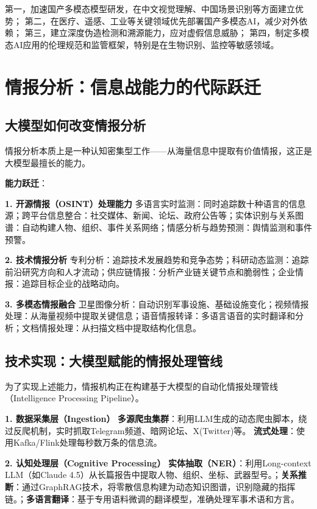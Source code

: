 第一，加速国产多模态模型研发，在中文视觉理解、中国场景识别等方面建立优势；
第二，在医疗、遥感、工业等关键领域优先部署国产多模态AI，减少对外依赖；
第三，建立深度伪造检测和溯源能力，应对虚假信息威胁；
第四，制定多模态AI应用的伦理规范和监管框架，特别是在生物识别、监控等敏感领域。

\section{情报分析：信息战能力的代际跃迁}

\subsection{大模型如何改变情报分析}

情报分析本质上是一种认知密集型工作——从海量信息中提取有价值情报，这正是大模型最擅长的能力。

\textbf{能力跃迁}：

\textbf{1. 开源情报（OSINT）处理能力}
多语言实时监测：同时追踪数十种语言的信息源；跨平台信息整合：社交媒体、新闻、论坛、政府公告等；实体识别与关系图谱：自动构建人物、组织、事件关系网络；情感分析与趋势预测：舆情监测和事件预警。

\textbf{2. 技术情报分析}
专利分析：追踪技术发展趋势和竞争态势；科研动态监测：追踪前沿研究方向和人才流动；供应链情报：分析产业链关键节点和脆弱性；企业情报：追踪目标企业的战略动向。

\textbf{3. 多模态情报融合}
卫星图像分析：自动识别军事设施、基础设施变化；视频情报处理：从海量视频中提取关键信息；语音情报转译：多语言语音的实时翻译和分析；文档情报处理：从扫描文档中提取结构化信息。

\subsection{技术实现：大模型赋能的情报处理管线}

为了实现上述能力，情报机构正在构建基于大模型的自动化情报处理管线（Intelligence Processing Pipeline）。

\textbf{1. 数据采集层（Ingestion）}
\textbf{多源爬虫集群}：利用LLM生成的动态爬虫脚本，绕过反爬机制，实时抓取Telegram频道、暗网论坛、X(Twitter)等。 \textbf{流式处理}：使用Kafka/Flink处理每秒数万条的信息流。

\textbf{2. 认知处理层（Cognitive Processing）}
\textbf{实体抽取（NER）}：利用Long-context LLM（如Claude 4.5）从长篇报告中提取人物、组织、坐标、武器型号。；\textbf{关系推断}：通过GraphRAG技术，将零散信息构建为动态知识图谱，识别隐藏的指挥链。；\textbf{多语言翻译}：基于专用语料微调的翻译模型，准确处理军事术语和方言。

